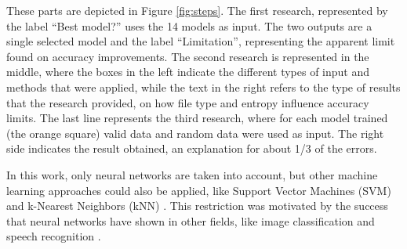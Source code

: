 These parts are depicted in Figure \ref{fig:steps}. The first research, represented by the label ``Best model?'' uses the 14 models as input. The two outputs are a single selected model and the label ``Limitation'', representing the apparent limit found on accuracy improvements. The second research is represented in the middle, where the boxes in the left indicate the different types of input and methods that were applied, while the text in the right refers to the type of results that the research provided, on how file type and entropy influence accuracy limits. The last line represents the third research, where for each model trained (the orange square) valid data and random data were used as input. The right side indicates the result obtained, an explanation for about 1/3 of the errors.

In this work, only neural networks are taken into account, but other machine learning approaches could also be applied, like Support Vector Machines (SVM) \cite{fitzgerald_using_2012} and k-Nearest Neighbors (kNN) \cite{axelsson_normalised_2010}. This restriction was motivated by the success that neural networks have shown in other fields, like image classification \cite{matan_reading_1992} and speech recognition \cite{graves_speech_2013}.
